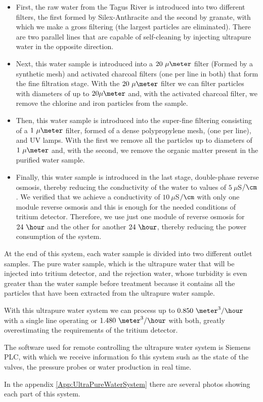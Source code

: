 \begin{itemize}
\item{} First, the raw water from the Tagus River is introduced into two different filters, the first formed by Silex-Anthracite and the second by granate, with which we make a gross filtering (the largest particles are eliminated). There are two parallel lines that are capable of self-cleaning by injecting ultrapure water in the opposite direction.

\item{} Next, this water sample is introduced into a $20~\mu\meter$ filter (Formed by a synthetic mesh) and activated charcoal filters (one per line in both) that form the fine filtration stage. With the $20~\mu\meter$ filter we can filter particles with diameters of up to $20\mu\meter$ and, with the activated charcoal filter, we remove the chlorine and iron particles from the sample.

\item{} Then, this water sample is introduced into the super-fine filtering consisting of a $1~\mu\meter$ filter, formed of a dense polypropylene mesh, (one per line), and UV lamps. With the first we remove all the particles up to diameters of $1~\mu\meter$ and, with the second, we remove the organic matter present in the purified water sample.

\item{} Finally, this water sample is introduced in the last stage, double-phase reverse osmosis, thereby reducing the conductivity of the water to values of $5~\mu$S$/\cm$. We verified that we achieve a conductivity of $10~\mu$S$/\cm$ with only one module reverse osmosis and this is enough for the needed conditions of tritium detector. Therefore, we use just one module of reverse osmosis for $24~\hour$ and the other for another $24~\hour$, thereby reducing the power consumption of the system.

\end{itemize}

At the end of this system, each water sample is divided into two different outlet samples. The pure water sample, which is the ultrapure water that will be injected into tritium detector, and the rejection water, whose turbidity is even greater than the water sample before treatment because it contains all the particles that have been extracted from the ultrapure water sample.

With this ultrapure water system we can process up to $0.850~\meter^3/\hour$ with a single line operating or $1.480~\meter^3/\hour$ with both, greatly overestimating the requirements of the tritium detector. 

The software used for remote controlling the ultrapure water system is Siemens PLC, with which we receive information fo this system sush as the state of the valves, the pressure probes or water production in real time. 

In the appendix \ref{App:UltraPureWaterSystem} there are several photos showing each part of this system.